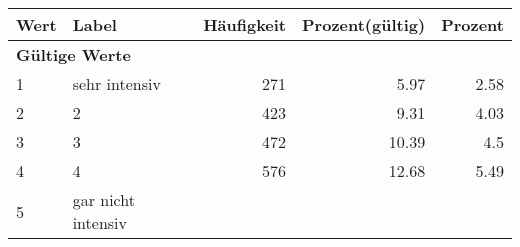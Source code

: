      \begin{longtable}{lXrrr}
     \toprule
     \textbf{Wert} & \textbf{Label} & \textbf{Häufigkeit} & \textbf{Prozent(gültig)} & \textbf{Prozent} \\
     \endhead
     \midrule
     \multicolumn{5}{l}{\textbf{Gültige Werte}}\\

     1 &
     \multicolumn{1}{X}{ sehr intensiv   } &


       \num{271} &
       \num[round-mode=places,round-precision=2]{5.97} &
         \num[round-mode=places,round-precision=2]{2.58} \\

     2 &
     \multicolumn{1}{X}{ 2   } &


       \num{423} &
       \num[round-mode=places,round-precision=2]{9.31} &
         \num[round-mode=places,round-precision=2]{4.03} \\

     3 &
     \multicolumn{1}{X}{ 3   } &


       \num{472} &
       \num[round-mode=places,round-precision=2]{10.39} &
         \num[round-mode=places,round-precision=2]{4.5} \\

     4 &
     \multicolumn{1}{X}{ 4   } &


       \num{576} &
       \num[round-mode=places,round-precision=2]{12.68} &
         \num[round-mode=places,round-precision=2]{5.49} \\

     5 &
     \multicolumn{1}{X}{ gar nicht intensiv   } &



\end{longtable}
